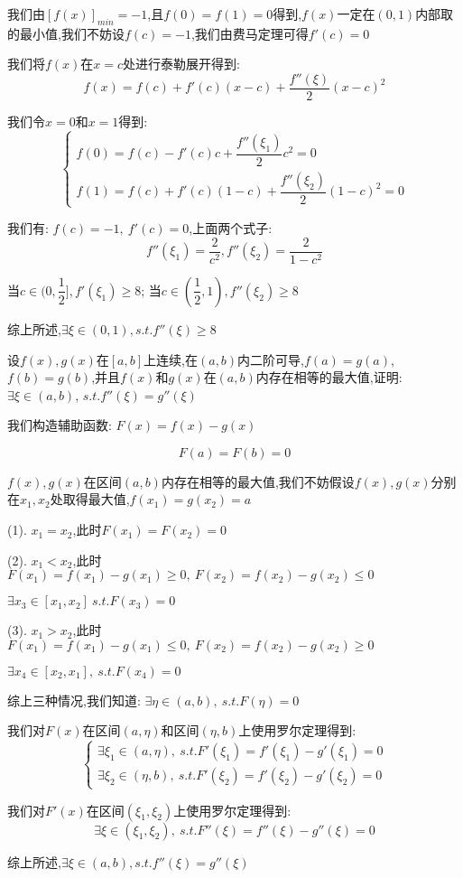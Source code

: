 \begin{anymark}[注: 泰勒展开]
	我们由$[f(x)]_{min}=-1$,且$f(0)=f(1)=0$得到,$f(x)$一定在$(0,1)$内部取的最小值,我们不妨设$f(c)=-1$,我们由费马定理可得$f'(c)=0$

	我们将$f(x)$在$x=c$处进行泰勒展开得到:
	$$f(x)=f(c)+f'(c)(x-c)+\dfrac{f''(\xi)}{2}(x-c)^2$$

	我们令$x=0$和$x=1$得到:
	$$\left\lbrace
		\begin{array}{l}
			f(0)=f(c)-f'(c)c+\dfrac{f''(\xi_{1})}{2}c^2=0 \\
			f(1)=f(c)+f'(c)(1-c)+\dfrac{f''(\xi_{2})}{2}(1-c)^2=0
		\end{array}
		\right. $$

	我们有: $f(c)=-1,\ f'(c)=0$,上面两个式子:
	$$f''(\xi_{1})=\dfrac{2}{c^2}, f''(\xi_{2})=\dfrac{2}{1-c^2}$$

	当$c\in(0,\dfrac{1}{2}],f'(\xi_{1})\geq 8$; 当$c\in(\dfrac{1}{2},1),f''(\xi_{2})\geq 8$

	综上所述,$\exists \xi\in(0,1), s.t. f''(\xi)\geq 8$
\end{anymark}

\begin{proposition}
	设$f(x),g(x)$在$[a,b]$上连续,在$(a,b)$内二阶可导,$f(a)=g(a)$,$f(b)=g(b)$,并且$f(x)$和$g(x)$在$(a,b)$内存在相等的最大值,证明: $\exists \xi\in(a,b)$, $s.t. f''(\xi)=g''(\xi)$
\end{proposition}
\begin{solution}

	我们构造辅助函数:  $F(x)=f(x)-g(x)$

	$$F(a)=F(b)=0$$

	$f(x),g(x)$在区间$(a,b)$内存在相等的最大值,我们不妨假设$f(x),g(x)$分别在$x_{1},x_{2}$处取得最大值,$f(x_{1})=g(x_{2})=a$

	(1). $x_{1}=x_{2}$,此时$F(x_{1})=F(x_{2})=0$

	(2). $x_{1}<x_{2}$,此时$F(x_{1})=f(x_{1})-g(x_{1})\geq 0,\ F(x_{2})=f(x_{2})-g(x_{2})\leq 0$

	$\exists x_{3}\in [x_{1},x_{2}] \ s.t. F(x_{3})=0$

	(3). $x_{1}>x_{2}$,此时$F(x_{1})=f(x_{1})-g(x_{1})\leq 0,\ F(x_{2})=f(x_{2})-g(x_{2})\geq 0$

	$\exists x_{4}\in [x_{2},x_{1}],\ s.t. F(x_{4})=0$

	综上三种情况,我们知道: $\exists \eta\in(a,b),\ s.t. F(\eta)=0$

	我们对$F(x)$在区间$(a,\eta)$和区间$(\eta,b)$上使用罗尔定理得到:
	$$\left\lbrace
		\begin{array}{l}
			\exists \xi_{1}\in(a,\eta),\ s.t. F'(\xi_{1})=f'(\xi_{1})-g'(\xi_{1})=0 \\
			\exists \xi_{2}\in(\eta,b),\ s.t. F'(\xi_{2})=f'(\xi_{2})-g'(\xi_{2})=0
		\end{array}
		\right. $$

	我们对$F'(x)$在区间$(\xi_{1},\xi_{2})$上使用罗尔定理得到:
	$$\exists \xi\in(\xi_{1},\xi_{2}),\ s.t. F''(\xi)=f''(\xi)-g''(\xi)=0$$

	综上所述,$\exists \xi\in(a,b), s.t. f''(\xi)=g''(\xi)$
\end{solution}

